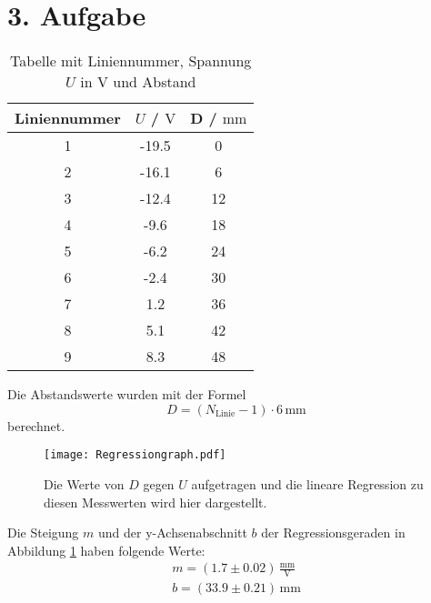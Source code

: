 \documentclass[titlepage = firstcover]{scrartcl}
\begin{document}
    \section*{3. Aufgabe}
        \begin{table}[h]
            \centering
            \caption{Tabelle mit Liniennummer, Spannung $U$ in $\mathrm{V}$ und Abstand}
            \label{tab:tabelle1}
            \begin{tabular}{c c c}
                \toprule
                Liniennummer & $U$ / $\mathrm{V}$ & D / $\mathrm{mm}$ \\
                \midrule
                1 & -19.5 & 0  \\
                2 & -16.1 & 6  \\
                3 & -12.4 & 12 \\
                4 & -9.6  & 18 \\
                5 & -6.2  & 24 \\
                6 & -2.4  & 30 \\
                7 & 1.2   & 36 \\
                8 & 5.1   & 42 \\
                9 & 8.3   & 48 \\
                \bottomrule
            \end{tabular}
        \end{table}
        \FloatBarrier
        \noindent
        Die Abstandswerte wurden mit der Formel
        \begin{equation*}
            D = (N_\text{Linie} - 1) \cdot 6 \, \mathrm{mm}
        \end{equation*}
        berechnet.
        \begin{figure}[h]
            \centering
            \caption{Die Werte von $D$ gegen $U$ aufgetragen und die lineare Regression zu diesen Messwerten wird hier dargestellt.}
            \label{fig:figure1}
            \texttt{[image: Regressiongraph.pdf]}
        \end{figure}
        \noindent
        Die Steigung $m$ und der y-Achsenabschnitt $b$ der Regressionsgeraden in Abbildung \ref{fig:figure1} haben folgende Werte:
        \begin{align*}
            m = (1.7 \pm 0.02) \, \frac{\mathrm{mm}}{\mathrm{V}} \\
            b = (33.9 \pm 0.21) \, \mathrm{mm}
        \end{align*}
\end{document}
